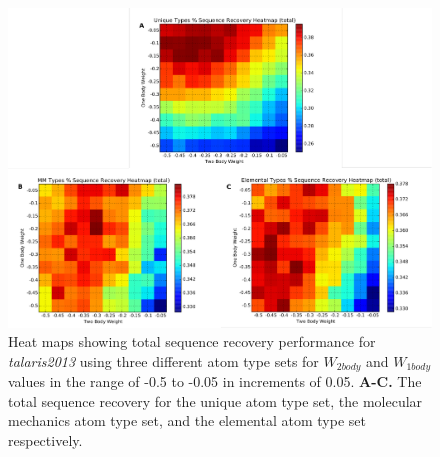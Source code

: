\begin{figure}[hbtp]
  \includegraphics[width=\linewidth]{Figures/small_gridsearch_atom_type_sets.pdf}
  \caption{Heat maps showing total sequence recovery performance for \textit{talaris2013} using three different atom type sets for $W_{2body}$ and $W_{1body}$ values in the range of -0.5 to -0.05 in increments of 0.05.
  \textbf{A-C.} The total sequence recovery for the unique atom type set, the molecular mechanics atom type set, and the elemental atom type set respectively.}
  \label{fig:gridsearch_atypes}
\end{figure}


